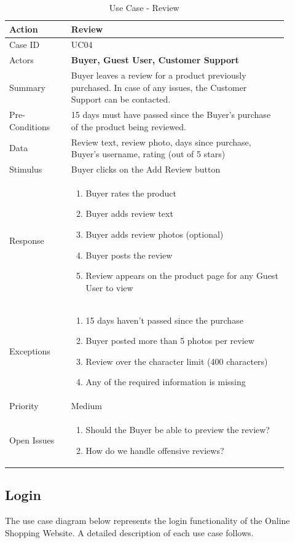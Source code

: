 \documentclass[11pt]{article}
\newcounter{use case ID}
\newcommand\tabularhead[1]{
    \begin{table}[ht]
        \addtocounter{use case ID}{1}
        \caption{Use Case \arabic{use case ID} - #1}
        \vspace{0.2cm}
        \begin{tabular}{|p{0.2\linewidth}|p{0.70\linewidth}|}
            \hline
            \textbf{Action} & \textbf{#1} \\
            \hline}
\newcommand\addrow[2]{#1 & #2\\ \hline}
\newcommand\addmulrow[2]{ \begin{minipage}[t][][t]{2.5cm}#1\end{minipage}
                &\begin{minipage}[t][][t]{11cm}
                    \begin{enumerate}[itemsep=-1ex] #2   \end{enumerate}
                \end{minipage}\vfill\\ \hline}
\newenvironment{usecase}{\tabularhead}
        {\hline\end{tabular}\end{table}}
\newcounter{req ID}
\begin{document}
\begin{usecase}{Review}
    \addrow{Case ID}{UC04}
    \addrow{Actors}{\textbf{Buyer, Guest User, Customer Support}}
    \addrow{Summary}{\index{buyer}Buyer leaves a \index{review}review for a product previously purchased. In case of any issues, the Customer Support can be contacted.}
    \addrow{Pre-Conditions}{
        15 days must have passed since the \index{buyer}Buyer’s purchase of the \index{product}product being reviewed.
        }
    \addrow{\index{data}Data}{
Review text, \index{review}review photo, days since purchase, Buyer’s username, rating (out of 5 stars)
}
    \addrow{Stimulus}{Buyer clicks on the Add Review button}
    \addmulrow{Response}{
        \item \index{buyer}Buyer rates the \index{product}product
        \item Buyer adds \index{review}review text
        \item Buyer adds review photos (optional)
        \item Buyer posts the review
        \item Review appears on the product page for any \index{guest user}Guest User to view
    }
    \addmulrow{Exceptions}{
        \item 15 days haven’t passed since the purchase
        \item Buyer posted more than 5 photos per \index{review}review
        \item Review over the character limit (400 characters)
        \item Any of the required \index{information}information is missing
    }
    \addrow{Priority}{Medium}
    \addmulrow{Open Issues}{
        \item Should the \index{buyer}Buyer be able to preview the review?
        \item How do we handle offensive \index{review}reviews?
    }
\end{usecase}


\clearpage
\subsection{Login}

The use case diagram below represents the login functionality of the Online Shopping Website. A detailed description of each use case follows.
\end{document}
